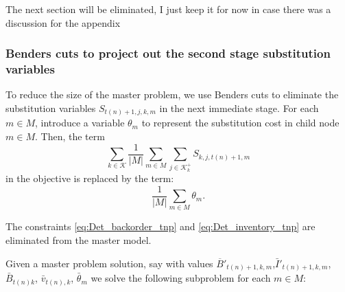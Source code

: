 \documentclass[10pt]{article}
\newcommand{\ti}{t} %
\newcommand{\ka}{k} %
\newcommand{\KA}{\mathcal{K}}
\newcommand{\jey}{j} %
\newcommand{\Csub}{\mathcal{K}^+_k}
\newcommand{\cred}{\color{red!65!black}}
\begin{document}
{\cred
\large{The next section will be eliminated, I just keep it for now in case there was a discussion for the appendix}

  \subsubsection{Benders cuts to project out the second stage substitution variables}
  
  
 To reduce the size of the master problem, we use Benders cuts to eliminate the substitution variables $S_{\ti(n)+1,\jey,\ka,m}$ in the next immediate stage. For each $m \in M$, introduce a variable $\theta_m$ to represent the substitution cost in child node $m \in M$. Then, the term 
 \[ \sum_{\ka \in \KA} \frac{1}{|M|} \sum_{m \in M} \sum_{\jey \in  \Csub} S_{k,j,\ti(n)+1,m} \]
 in the objective is replaced by the term:
 \[ \frac{1}{|M|} \sum_{m \in M} \theta_m. \]

The constraints \eqref{eq:Det_backorder_tnp} and \eqref{eq:Det_inventory_tnp} are eliminated from the master model. 

Given a master problem solution, say with values $\overline{B}'_{\ti(n)+1 , \ka,m}$,$\bar{I}'_{\ti(n)+1 , \ka,m}$,$\bar{B}_{ \ti(n) \ka}$, $\bar{v}_{\ti(n) , \ka}$, $\bar{\theta}_m$ we solve the following subproblem for each $m \in M$:

}
\end{document}

